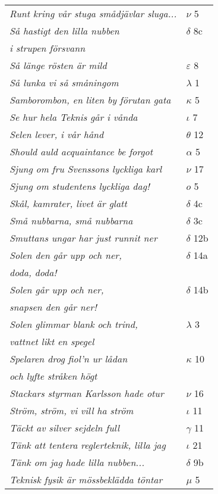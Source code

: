 \documentclass[a6paper,10pt]{article}
\begin{document}
\newpage
\setlength{\oddsidemargin}{-0.47in}
\begin{table}[!h]
\begin{tabular}{l l}
\textit{Runt kring vår stuga smådjävlar sluga...}	&$\nu$ 5\\
\textit{Så hastigt den lilla nubben}	&$\delta$ 8c\\
\textit{i strupen försvann} &\\
\textit{Så länge rösten är mild}	&$\varepsilon$ 8\\
\textit{Så lunka vi så småningom}	&$\lambda$ 1\\
\textit{Samborombon, en liten by förutan gata}	&$\kappa$ 5\\
\textit{Se hur hela Teknis går i vånda}	&$\iota$ 7\\
\textit{Selen lever, i vår hånd}	&$\theta$ 12\\
\textit{Should auld acquaintance be forgot}	&$\alpha$ 5\\
\textit{Sjung om fru Svenssons lyckliga karl}	&$\nu$ 17\\
\textit{Sjung om studentens lyckliga dag!}	&$o$ 5\\
\textit{Skål, kamrater, livet är glatt}	&$\delta$ 4c\\
\textit{Små nubbarna, små nubbarna}	&$\delta$ 3c\\
\textit{Smuttans ungar har just runnit ner}	&$\delta$ 12b\\
\textit{Solen den går upp och ner,}	&$\delta$ 14a\\
\textit{doda, doda!} &\\
\textit{Solen går upp och ner,}	&$\delta$ 14b\\
\textit{snapsen den går ner!} &\\
\textit{Solen glimmar blank och trind,}	&$\lambda$ 3\\
\textit{vattnet likt en spegel} &\\
\textit{Spelaren drog fiol'n ur lådan}	&$\kappa$ 10\\
\textit{och lyfte stråken högt} &\\
\textit{Stackars styrman Karlsson hade otur}	&$\nu$ 16\\
\textit{Ström, ström, vi vill ha ström}	&$\iota$ 11\\
\textit{Täckt av silver sejdeln full}	&$\gamma$ 11\\
\textit{Tänk att tentera reglerteknik, lilla jag}&$\iota$ 21\\
\textit{Tänk om jag hade lilla nubben...}	&$\delta$ 9b\\
\textit{Teknisk fysik är mössbeklädda töntar}	&$\mu$ 5\\
\end{tabular}
\end{table}
\end{document}
